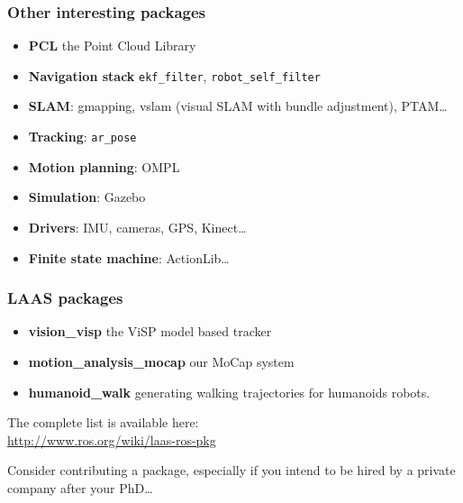 \documentclass[hyperref={pdfpagelabels=false}]{beamer}
\begin{document}
\begin{frame}[fragile]
  \frametitle{Other interesting packages}

  \begin{itemize}
  \item \textbf{PCL} the Point Cloud Library
  \item \textbf{Navigation stack} \texttt{ekf\_filter},
    \texttt{robot\_self\_filter}
  \item \textbf{SLAM}: gmapping, vslam (visual SLAM with bundle
    adjustment), PTAM\ldots
  \item \textbf{Tracking}: \texttt{ar\_pose}
  \item \textbf{Motion planning}: OMPL
  \item \textbf{Simulation}: Gazebo
  \item \textbf{Drivers}: IMU, cameras, GPS, Kinect\ldots
  \item \textbf{Finite state machine}: ActionLib\ldots
  \end{itemize}
\end{frame}

\begin{frame}[fragile]
  \frametitle{LAAS packages}

  \begin{itemize}
  \item \textbf{vision\_visp} the ViSP model based tracker
  \item \textbf{motion\_analysis\_mocap} our MoCap system
  \item \textbf{humanoid\_walk} generating walking trajectories for
    humanoids robots.
  \end{itemize}

  The complete list is available here:\\
  \url{http://www.ros.org/wiki/laas-ros-pkg}

  \vspace{0.3cm}

  Consider contributing a package, especially if you intend to
  be hired by a private company after your PhD\ldots

\end{frame}
\end{document}
